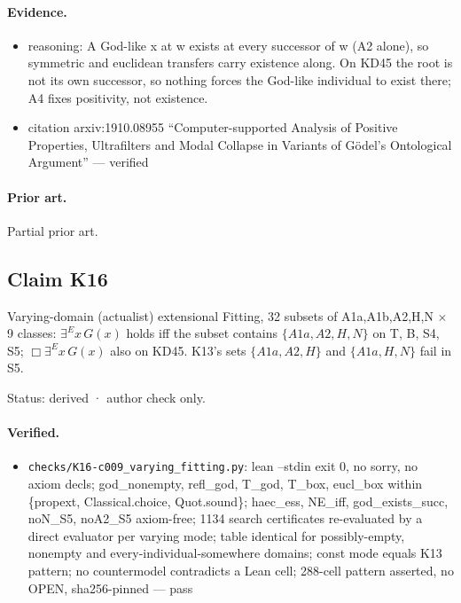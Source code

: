 \documentclass{article}
\begin{document}
\paragraph{Evidence.}
\begin{itemize}
\item reasoning: A God-like x at w exists at every successor of w (A2 alone), so symmetric and euclidean transfers carry existence along. On KD45 the root is not its own successor, so nothing forces the God-like individual to exist there; A4 fixes positivity, not existence.
\item citation arxiv:1910.08955 “Computer-supported Analysis of Positive Properties, Ultrafilters and Modal Collapse in Variants of Gödel’s Ontological Argument” --- verified
\end{itemize}

\paragraph{Prior art.} Partial prior art.

\subsection*{Claim K16}

Varying-domain (actualist) extensional Fitting, 32 subsets of A1a,A1b,A2,H,N $\times$ 9 classes: $\exists^E x\,G(x)$ holds iff the subset contains $\{A1a,A2,H,N\}$ on T, B, S4, S5; $\Box\exists^E x\,G(x)$ also on KD45. K13's sets $\{A1a,A2,H\}$ and $\{A1a,H,N\}$ fail in S5.

Status: derived · author check only.

\paragraph{Verified.}
\begin{itemize}
\item \texttt{checks/K16-c009\_varying\_fitting.py}: lean --stdin exit 0, no sorry, no axiom decls; god\_nonempty, refl\_god, T\_god, T\_box, eucl\_box within \{propext, Classical.choice, Quot.sound\}; haec\_ess, NE\_iff, god\_exists\_succ, noN\_S5, noA2\_S5 axiom-free; 1134 search certificates re-evaluated by a direct evaluator per varying mode; table identical for possibly-empty, nonempty and every-individual-somewhere domains; const mode equals K13 pattern; no countermodel contradicts a Lean cell; 288-cell pattern asserted, no OPEN, sha256-pinned --- pass
\end{itemize}
\end{document}

